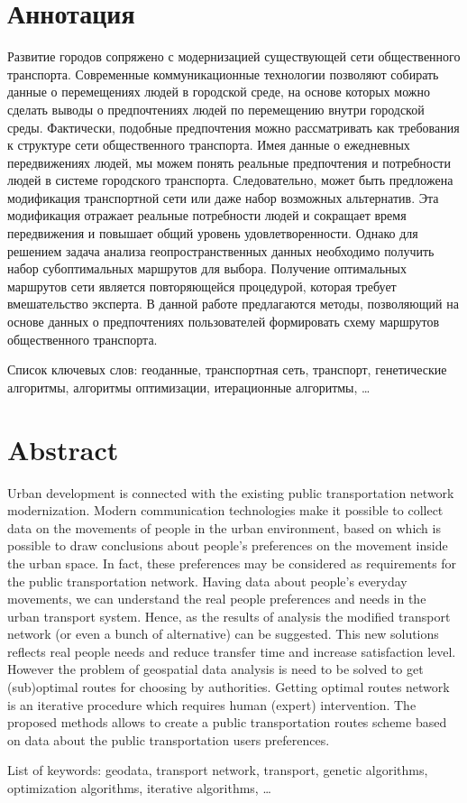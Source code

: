 \tocless\part{Аннотация}
Развитие городов сопряжено с модернизацией существующей сети общественного транспорта. Современные 
коммуникационные технологии позволяют собирать данные о перемещениях людей в городской среде, на основе 
которых можно сделать выводы о предпочтениях людей по перемещению внутри городской среды. Фактически, 
подобные предпочтения можно рассматривать как требования к структуре сети общественного транспорта. 
Имея данные о ежедневных передвижениях людей, мы можем понять реальные предпочтения и потребности людей 
в системе городского транспорта. Следовательно, может быть предложена модификация транспортной сети или 
даже набор возможных альтернатив. Эта модификация отражает реальные потребности людей и сокращает время 
передвижения и повышает общий уровень удовлетворенности. Однако для решением задача анализа 
геопространственных данных необходимо получить набор субоптимальных маршрутов для выбора. Получение 
оптимальных маршрутов сети является повторяющейся процедурой, которая требует вмешательство эксперта.
В данной работе предлагаются методы, позволяющий на основе данных о предпочтениях пользователей формировать 
схему маршрутов общественного транспорта.

Список ключевых слов: геоданные, транспортная сеть, транспорт, генетические алгоритмы, 
алгоритмы оптимизации, итерационные алгоритмы, \ldots

\tocless\part{Abstract}
Urban development is connected with the existing public transportation network modernization. Modern 
communication technologies make it possible to collect data on the movements of people in the urban 
environment, based on which is possible to draw conclusions about people's preferences on the movement 
inside the urban space. In fact, these preferences may be considered as requirements for the public 
transportation network. Having data about people's everyday movements, we can understand the real 
people preferences and needs in the urban transport system. Hence, as the results of analysis the 
modified transport network (or even a bunch of alternative) can be suggested. This new solutions reflects 
real people needs and reduce transfer time and increase satisfaction level. However the problem of 
geospatial data analysis is need to be solved to get (sub)optimal routes for choosing by authorities. 
Getting optimal routes network is an iterative procedure which requires human (expert) intervention.
The proposed methods allows to create a public transportation routes scheme based on data about the 
public transportation users preferences.

List of keywords: geodata, transport network, transport, genetic algorithms, optimization algorithms,
iterative algorithms, \ldots
